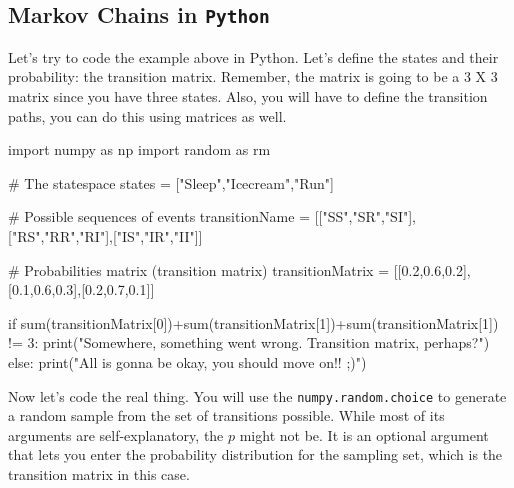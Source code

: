 \subsection{Markov Chains in \texttt{Python}}
Let's try to code the example above in Python. 
Let's define the states and their probability: the transition matrix. Remember, the matrix is going to be a 3 X 3 matrix since you have three states. Also, you will have to define the transition paths, you can do this using matrices as well.
\begin{ipython}
import numpy as np
import random as rm

# The statespace
states = ["Sleep","Icecream","Run"]

# Possible sequences of events
transitionName = [["SS","SR","SI"],["RS","RR","RI"],["IS","IR","II"]]

# Probabilities matrix (transition matrix)
transitionMatrix = [[0.2,0.6,0.2],[0.1,0.6,0.3],[0.2,0.7,0.1]]

if sum(transitionMatrix[0])+sum(transitionMatrix[1])+sum(transitionMatrix[1]) != 3:
    print("Somewhere, something went wrong. Transition matrix, perhaps?")
else: 
    print("All is gonna be okay, you should move on!! ;)")
\end{ipython}

Now let's code the real thing. You will use the \texttt{numpy.random.choice} to generate a random sample from the set of transitions possible. While most of its arguments are self-explanatory, the $p$ might not be. It is an optional argument that lets you enter the probability distribution for the sampling set, which is the transition matrix in this case.

